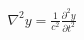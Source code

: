 \documentclass[preview]{standalone}
\begin{document}
\begin{align*}
\nabla^2 y =\frac{1}{c^2} \frac{\partial^2y }{\partial t^2}
\end{align*}
\end{document}
